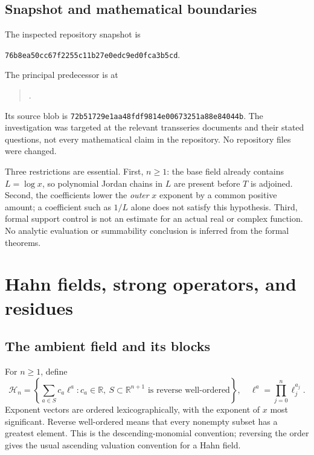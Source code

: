 \documentclass[11pt,a4paper]{article}
\numberwithin{equation}{section}
\theoremstyle{definition}
\theoremstyle{remark}
\theoremstyle{definition}
\newcommand{\R}{\mathbb R}
\newcommand{\Hh}{\mathcal H}
\newcommand{\snap}{76b8ea50cc67f2255c11b27e0edc9ed0fca3b5cd}
\begin{document}
\subsection{Snapshot and mathematical boundaries}
The inspected repository snapshot is
\begin{center}\small\texttt{\snap}.\end{center}
The principal predecessor is at
\begin{quote}\small
{}\allowbreak
{}.
\end{quote}
Its source blob is \texttt{72b51729e1aa48fdf9814e00673251a88e84044b}. The investigation was targeted at the relevant transseries documents and their stated questions, not every mathematical claim in the repository. No repository files were changed.

Three restrictions are essential. First, $n\ge1$: the base field already contains $L=\log x$, so polynomial Jordan chains in $L$ are present before $T$ is adjoined. Second, the coefficients lower the \emph{outer} $x$ exponent by a common positive amount; a coefficient such as $1/L$ alone does not satisfy this hypothesis. Third, formal support control is not an estimate for an actual real or complex function. No analytic evaluation or summability conclusion is inferred from the formal theorems.

\section{Hahn fields, strong operators, and residues}
\label{sec:hahn}

\subsection{The ambient field and its blocks}
For $n\ge1$, define
\begin{equation}
 \Hh_n=\left\{\sum_{a\in S}c_a\ell^a:
 c_a\in\R,\ S\subset\R^{n+1}\text{ is reverse well-ordered}\right\},
 \quad \ell^a=\prod_{j=0}^{n}\ell_j^{a_j}.
 \label{eq:hahn}
\end{equation}
Exponent vectors are ordered lexicographically, with the exponent of $x$ most significant. Reverse well-ordered means that every nonempty subset has a greatest element. This is the descending-monomial convention; reversing the order gives the usual ascending valuation convention for a Hahn field.
\end{document}
